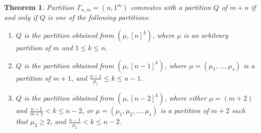 \documentclass[11pt]{amsproc}
\newtheorem{thm}{Theorem}
\begin{document}
\begin{thm}\label{all that commute with hook}
    Partition $\Gamma_{n,m} =\left(n,1^m\right)$ commutes with a partition $Q$ of $m+n$ if and only if $Q$ is one of the following partitions:
    \begin{enumerate}
        \item[(a)] $Q$ is the partition obtained from $\left(\mu, [n]^k\right)$, where $\mu$ is an arbitrary partition of $m$ and $1\leq k\leq n$.
        \item[(b)] $Q$ is the partition obtained from $\left(\mu,[n-1]^k\right)$, where $\mu=(\mu_1,\ldots, \mu_s)$ is a partition of $m+1$, and $\frac{n-1}{\mu_1}\leq k\leq n-1$.
        \item[(c)] $Q$ is the partition obtained from $\left(\mu, [n-2]^k\right)$, where either $\mu=(m+2)$ and $\frac{n-1}{m+1}< k \leq n-2$, or $\mu=(\mu_1, \mu_2, \ldots, \mu_s)$ is a partition of $m+2$ such that $\mu_2\geq 2$, and $\frac{n-1}{\mu_2} < k \leq n-2$.
    \end{enumerate}
\end{thm}
\end{document}
